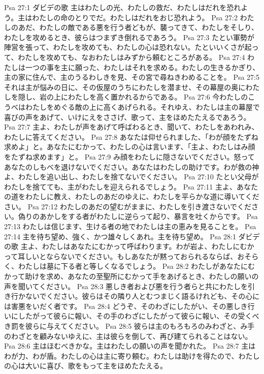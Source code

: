 Psa 27:1  ダビデの歌 主はわたしの光、わたしの救だ、わたしはだれを恐れよう。主はわたしの命のとりでだ。わたしはだれをおじ恐れよう。
Psa 27:2  わたしのあだ、わたしの敵である悪を行う者どもが、襲ってきて、わたしをそしり、わたしを攻めるとき、彼らはつまずき倒れるであろう。
Psa 27:3  たとい軍勢が陣営を張って、わたしを攻めても、わたしの心は恐れない。たといいくさが起って、わたしを攻めても、なおわたしはみずから頼むところがある。
Psa 27:4  わたしは一つの事を主に願った、わたしはそれを求める。わたしの生きるかぎり、主の家に住んで、主のうるわしきを見、その宮で尋ねきわめることを。
Psa 27:5  それは主が悩みの日に、その仮屋のうちにわたしを潜ませ、その幕屋の奥にわたしを隠し、岩の上にわたしを高く置かれるからである。
Psa 27:6  今わたしのこうべはわたしをめぐる敵の上に高くあげられる。それゆえ、わたしは主の幕屋で喜びの声をあげて、いけにえをささげ、歌って、主をほめたたえるであろう。
Psa 27:7  主よ、わたしが声をあげて呼ばわるとき、聞いて、わたしをあわれみ、わたしに答えてください。
Psa 27:8  あなたは仰せられました、「わが顔をたずね求めよ」と。あなたにむかって、わたしの心は言います、「主よ、わたしはみ顔をたずね求めます」と。
Psa 27:9  み顔をわたしに隠さないでください。怒ってあなたのしもべを退けないでください。あなたはわたしの助けです。わが救の神よ、わたしを追い出し、わたしを捨てないでください。
Psa 27:10  たとい父母がわたしを捨てても、主がわたしを迎えられるでしょう。
Psa 27:11  主よ、あなたの道をわたしに教え、わたしのあだのゆえに、わたしを平らかな道に導いてください。
Psa 27:12  わたしのあだの望むがままに、わたしを引き渡さないでください。偽りのあかしをする者がわたしに逆らって起り、暴言を吐くからです。
Psa 27:13  わたしは信じます、生ける者の地でわたしは主の恵みを見ることを。
Psa 27:14  主を待ち望め、強く、かつ雄々しくあれ。主を待ち望め。
Psa 28:1  ダビデの歌 主よ、わたしはあなたにむかって呼ばわります。わが岩よ、わたしにむかって耳しいとならないでください。もしあなたが黙っておられるならば、おそらく、わたしは墓に下る者と等しくなるでしょう。
Psa 28:2  わたしがあなたにむかって助けを求め、あなたの至聖所にむかって手をあげるとき、わたしの願いの声を聞いてください。
Psa 28:3  悪しき者および悪を行う者らと共にわたしを引き行かないでください。彼らはその隣り人とむつまじく語るけれども、その心には害悪をいだく者です。
Psa 28:4  どうぞ、そのわざにしたがい、その悪しき行いにしたがって彼らに報い、その手のわざにしたがって彼らに報い、その受くべき罰を彼らに与えてください。
Psa 28:5  彼らは主のもろもろのみわざと、み手のわざとを顧みないゆえに、主は彼らを倒して、再び建てられることはない。
Psa 28:6  主はほむべきかな。主はわたしの願いの声を聞かれた。
Psa 28:7  主はわが力、わが盾。わたしの心は主に寄り頼む。わたしは助けを得たので、わたしの心は大いに喜び、歌をもって主をほめたたえる。
